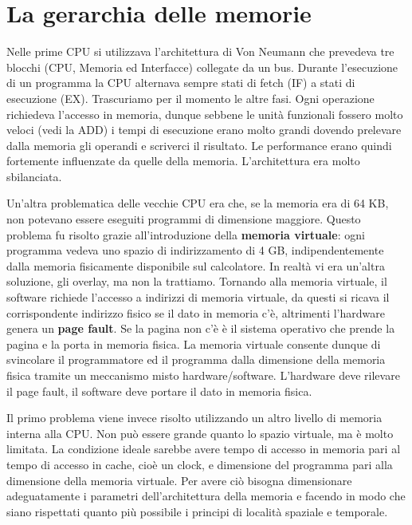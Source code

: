 \documentclass[11pt]{book}
\begin{document}
\setcounter{chapter}{2}
\chapter{La gerarchia delle memorie}

Nelle prime CPU si utilizzava l'architettura di Von Neumann che
prevedeva tre blocchi (CPU, Memoria ed Interfacce) collegate da un
bus. Durante l'esecuzione di un programma la CPU alternava sempre
stati di fetch (IF) a stati di esecuzione (EX). Trascuriamo per il
momento le altre fasi. Ogni operazione richiedeva l'accesso in
memoria, dunque sebbene le unit\`a funzionali fossero molto veloci
(vedi la ADD) i tempi di esecuzione erano molto grandi dovendo
prelevare dalla memoria gli operandi e scriverci il risultato. Le
performance erano quindi fortemente influenzate da quelle della
memoria. L'architettura era molto sbilanciata.

\par\bigskip

Un'altra problematica delle vecchie CPU era che, se la memoria era di
64 KB, non potevano essere eseguiti programmi di dimensione
maggiore. Questo problema fu risolto grazie all'introduzione della
{\bf memoria virtuale}: ogni programma vedeva uno spazio di
indirizzamento di 4 GB, indipendentemente dalla memoria fisicamente
disponibile sul calcolatore. In realt\`a vi era un'altra soluzione,
gli overlay, ma non la trattiamo. Tornando alla memoria virtuale, il
software richiede l'accesso a indirizzi di memoria virtuale, da questi
si ricava il corrispondente indirizzo fisico se il dato in memoria
c'\`e, altrimenti l'hardware genera un {\bf page fault}. Se la pagina
non c'\`e \`e il sistema operativo che prende la pagina e la porta in
memoria fisica. La memoria virtuale consente dunque di svincolare il
programmatore ed il programma dalla dimensione della memoria fisica
tramite un meccanismo misto hardware/software. L'hardware deve
rilevare il page fault, il software deve portare il dato in memoria
fisica.

\par\bigskip

Il primo problema viene invece risolto utilizzando un altro livello di
memoria interna alla CPU. Non pu\`o essere grande quanto lo spazio
virtuale, ma \`e molto limitata. La condizione ideale sarebbe avere
tempo di accesso in memoria pari al tempo di accesso in cache, cio\`e
un clock, e dimensione del programma pari alla dimensione della
memoria virtuale. Per avere ci\`o bisogna dimensionare adeguatamente i
parametri dell'architettura della memoria e facendo in modo che siano
rispettati quanto pi\`u possibile i principi di localit\`a spaziale e
temporale.
\end{document}
